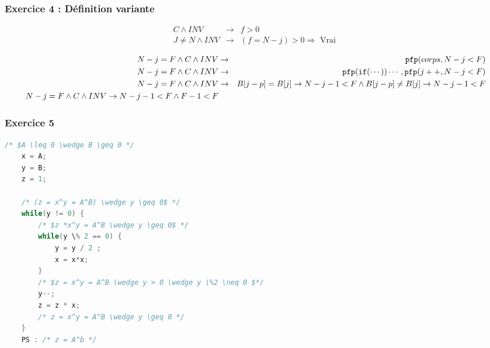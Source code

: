 \subsubsection{Exercice 4 : Définition variante}
\begin{eqnarray*}
	C \wedge INV &\rightarrow& f > 0\\
	J \neq N \wedge INV &\rightarrow& (f = N-j) >0 \Rightarrow \textrm{ Vrai }
\end{eqnarray*}

\begin{eqnarray*}
	N-j  =F \wedge C \wedge INV &\rightarrow& \texttt{pfp}(corps, N-j < F)\\
	N-j  =F \wedge C \wedge INV &\rightarrow& \texttt{pfp}(\texttt{if}(\cdots))\cdots,\texttt{pfp}(j++,N-j<F)\\
	N-j  =F \wedge C \wedge INV &\rightarrow& B|j-p] = B[j] \rightarrow N - j -1 < F \wedge B[j-p] \neq B[j] \rightarrow N-j-1 < F\\
	N-j = F \wedge C \wedge INV \rightarrow N-j-1 < F \wedge F-1 < F
\end{eqnarray*}

\subsubsection{Exercice 5}

\begin{lstlisting}[language=C]
	/* $A \leq 0 \wedge B \geq 0 */
	x = A;
	y = B;
	z = 1;

	/* (z = x^y = A^B) \wedge y \geq 0$ */
	while(y != 0) {
		/* $z *x^y = A^B \wedge y \geq 0$ */
		while(y \% 2 == 0) {
			y = y / 2 ;
			x = x*x;
		}
		/* $z = x^y = A^B \wedge y > 0 \wedge y \%2 \neq 0 $*/
		y--;
		z = z * x;
		/* z = x^y = A^B \wedge y \geq 0 */
	}
	PS : /* z = A^b */

\end{lstlisting}
